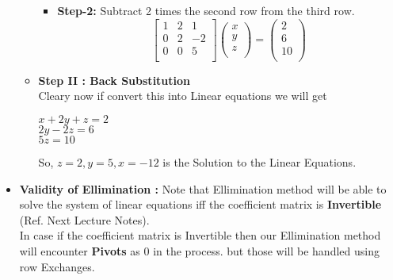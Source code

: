 \documentclass[a4paper,11pt]{article}
\numberwithin{equation}{section}
\begin{document}
\begin{itemize}
\begin{itemize}
\begin{itemize}
\begin{equation}
                \end{equation}
                \item \textbf{Step-2:} Subtract 2 times the second row from the third row.
                \begin{equation}
                    \begin{bmatrix}
                        1 & 2 & 1 \\
                        0 & 2 & -2 \\
                        0 & 0 & 5 \\
                    \end{bmatrix}
                    \begin{pmatrix}
                        x \\
                        y \\
                        z \\
                    \end{pmatrix}=
                    \begin{pmatrix}
                        2 \\
                        6 \\
                        10 \\
                    \end{pmatrix}
                \end{equation}
            \end{itemize}

        \item \textbf{Step II : Back Substitution}\\
            Cleary now if convert this into Linear equations
            we will get\\

            \begin{center}
                $x+2y+z=2$\\
                $2y-2z=6$\\
                $5z=10$\\
            \end{center}

            So, $z=2,y=5,x=-12$ is the Solution to the Linear Equations.        
        \end{itemize}
       

        \item \textbf{Validity of Ellimination : }Note that Ellimination method will be able to solve the system of  linear equations iff the coefficient matrix is \textbf{Invertible} (Ref. Next Lecture Notes).\\
        In case if the coefficient matrix is Invertible then our Ellimination method will encounter \textbf{Pivots} as $0$ in the process. but those will be handled using row Exchanges.


\end{itemize}
\end{document}
